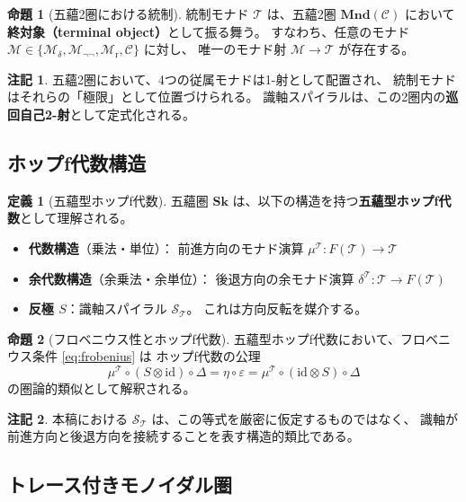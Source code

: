 \documentclass[11pt,a4paper]{ltjsarticle}
\theoremstyle{definition}
\newtheorem{definition}{定義}[section]
\newtheorem{proposition}{命題}[section]
\newtheorem{remark}{注記}[section]
\newcommand{\Sk}{\mathbf{Sk}}
\newcommand{\id}{\mathrm{id}}
\newcommand{\Mdelta}{\mathcal{M}_{\delta}}
\newcommand{\Mneg}{\mathcal{M}_{\neg\neg}}
\newcommand{\Mr}{\mathcal{M}_{\mathrm{r}}}
\newcommand{\Mc}{\mathcal{C}}
\newcommand{\T}{\mathcal{T}}
\newcommand{\SpiralT}{\mathcal{S}_{\mathcal{T}}}
\newcommand{\fold}{\mu}
\newcommand{\unfold}{\delta}
\begin{document}
\begin{proposition}[五蘊2圏における統制]
統制モナド $\T$ は、五蘊2圏 $\mathbf{Mnd}(\mathcal{C})$ において
\textbf{終対象（terminal object）}として振る舞う。
すなわち、任意のモナド $\mathcal{M} \in \{\Mdelta, \Mneg, \Mr, \Mc\}$ に対し、
唯一のモナド射 $\mathcal{M} \to \T$ が存在する。
\end{proposition}

\begin{remark}
五蘊2圏において、4つの従属モナドは1-射として配置され、
統制モナドはそれらの「極限」として位置づけられる。
識軸スパイラルは、この2圏内の\textbf{巡回自己2-射}として定式化される。
\end{remark}

\subsection{ホップf代数構造}

\begin{definition}[五蘊型ホップf代数]
五蘊圏 $\Sk$ は、以下の構造を持つ\textbf{五蘊型ホップf代数}として理解される。

\begin{itemize}
\item \textbf{代数構造}（乗法・単位）：
  前進方向のモナド演算 $\fold^\T : F(\T) \to \T$
\item \textbf{余代数構造}（余乗法・余単位）：
  後退方向の余モナド演算 $\unfold^\T : \T \to F(\T)$
\item \textbf{反極 $S$}：識軸スパイラル $\SpiralT$。
  これは方向反転を媒介する。
\end{itemize}
\end{definition}

\begin{proposition}[フロベニウス性とホップf代数]
五蘊型ホップf代数において、フロベニウス条件 \eqref{eq:frobenius} は
ホップf代数の公理
\begin{equation}
\fold^\T \circ (S \otimes \id) \circ \Delta 
= \eta \circ \varepsilon 
= \fold^\T \circ (\id \otimes S) \circ \Delta
\end{equation}
の圏論的類似として解釈される。
\end{proposition}

\begin{remark}
本稿における $\SpiralT$ は、この等式を厳密に仮定するものではなく、
識軸が前進方向と後退方向を接続することを表す構造的類比である。
\end{remark}

\subsection{トレース付きモノイダル圏}
\end{document}
